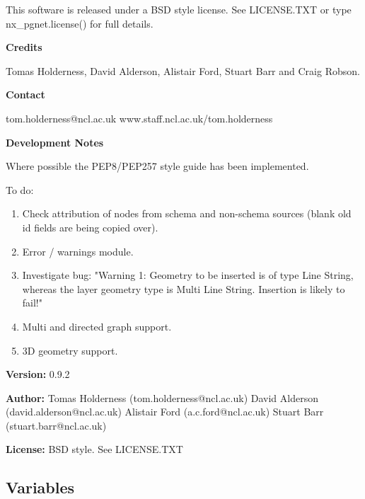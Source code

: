 This software is released under a BSD style license. See LICENSE.TXT or 
type nx\_pgnet.license() for full details.

\textbf{Credits}

Tomas Holderness, David Alderson, Alistair Ford, Stuart Barr and Craig 
Robson.

\textbf{Contact}

tom.holderness@ncl.ac.uk www.staff.ncl.ac.uk/tom.holderness

\textbf{Development Notes}

Where possible the PEP8/PEP257 style guide has been implemented.

To do:

\begin{enumerate}

\setlength{\parskip}{0.5ex}
  \item Check attribution of nodes from schema and non-schema sources (blank 
    old id fields are being copied over).

  \item Error  / warnings module.

  \item Investigate bug: "Warning 1: Geometry to be inserted is of type Line 
    String, whereas the layer geometry type is Multi Line String. Insertion
    is likely to fail!"

  \item Multi and directed graph support.

  \item 3D geometry support.

\end{enumerate}

\textbf{Version:} 0.9.2



\textbf{Author:} Tomas Holderness (tom.holderness@ncl.ac.uk)
David Alderson (david.alderson@ncl.ac.uk)
Alistair Ford (a.c.ford@ncl.ac.uk)
Stuart Barr (stuart.barr@ncl.ac.uk)



\textbf{License:} BSD style. See LICENSE.TXT





  \subsection{Variables}

